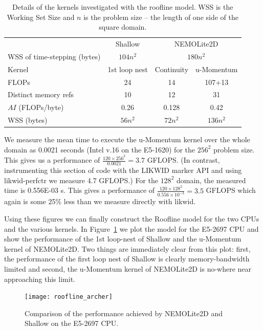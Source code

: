 \documentclass[12pt]{article}
\begin{document}
\begin{table}
\begin{tabular}{|l|c|c|c|}
\hline
                             & Shallow & \multicolumn{2}{c|}{NEMOLite2D} \\
WSS of time-stepping (bytes) & $104n^2$ & \multicolumn{2}{c|}{$180n^2$} \\ 
\hline
Kernel                     & 1st loop nest & Continuity & u-Momentum \\
\hline                                
FLOPs                      & 24      &    14      &   107+13   \\
Distinct memory refs       & 10      &    12      &   31       \\
$AI$ (FLOPs/byte)          & 0.26    &  0.128     &   0.42     \\
WSS (bytes)                & $56n^2$ &  $72n^2$   &   $136n^2$ \\
\hline
\end{tabular}
\caption{Details of the kernels investigated with the roofline
  model. WSS is the Working Set Size and $n$ is the problem size --
  the length of one side of the square domain.}
\label{TAB_kernel_details}
\end{table}

We measure the mean time to execute the u-Momentum kernel over the
whole domain as 0.0021 seconds (Intel v.16 on the E5-1620) for the
$256^2$ problem size. This gives us a performance of $\frac{120\times
  256^2}{0.0021} = 3.7$ GFLOPS. (In contrast, instrumenting this
section of code with the LIKWID marker API and using likwid-perfctr we
measure 4.7 GFLOPS.)  For the $128^2$ domain, the measured time is
0.556E-03 s. This gives a performance of $\frac{120\times
  128^2}{0.556\times10^{-3}} = 3.5$ GFLOPS which again is some 25\% less
than we measure directly with likwid.

Using these figures we can finally construct the Roofline model for
the two CPUs and the various kernels. In
Figure~\ref{FIG_roofline_archer} we plot the model for the E5-2697 CPU
and show the performance of the 1st loop-nest of Shallow and the
u-Momentum kernel of NEMOLite2D. Two things are immediately clear from
this plot: first, the performance of the first loop nest of Shallow is
clearly memory-bandwidth limited and second, the u-Momentum kernel of
NEMOLite2D is no-where near approaching this limit.

\begin{figure}
\centering
\texttt{[image: roofline\_archer]}
\caption{Comparison of the performance achieved by NEMOLite2D and
  Shallow on the E5-2697 CPU.}
\label{FIG_roofline_archer}
\end{figure}
\end{document}

